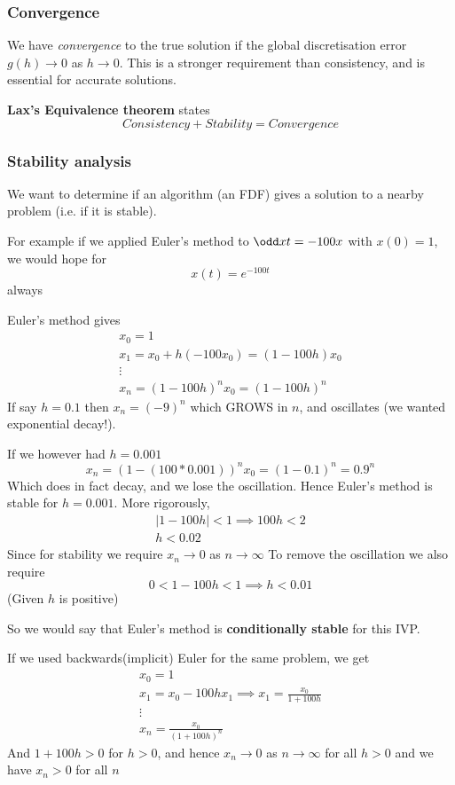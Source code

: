 \documentclass{X:/Documents/Coding/Latex/myassignment}
\begin{document}
\subsubsection{Convergence}
We have \textit{convergence} to the true solution if the global discretisation error $g(h)\to 0$ as $h\to0$. This is a stronger requirement than consistency, and is essential for accurate solutions.

\textbf{Lax's Equivalence theorem} states
\[Consistency + Stability = Convergence\]

\subsubsection{Stability analysis}
We want to determine if an algorithm (an FDF) gives a solution to a nearby problem (i.e. if it is stable).

For example if we applied Euler's method to $\odd xt = -100x$ with $x(0)=1$, we would hope for
\[x(t) = e^{-100t}\]
always

Euler's method gives
\begin{align*}
    x_0 = 1\\
    x_1 = x_0 + h(-100x_0) = (1-100h)x_0\\
    \vdots\\
    x_n = (1-100h)^n x_0 = (1-100h)^n
\end{align*}
If say $h = 0.1$ then $x_n = (-9)^n$ which GROWS in $n$, and oscillates (we wanted exponential decay!).

If we however had $h = 0.001$
\[x_n = (1-(100*0.001))^n x_0 = (1-0.1)^n = 0.9^n\]
Which does in fact decay, and we lose the oscillation.
Hence Euler's method is stable for $h=0.001$.
More rigorously, 
\begin{align*}
    |1-100h|<1 \implies 100h < 2\\
    h < 0.02
\end{align*}
Since for stability we require $x_n\to 0$ as $n\to \infty$
To remove the oscillation we also require 
\[0<1-100h < 1 \implies h < 0.01\]
(Given $h$ is positive)

So we would say that Euler's method is \textbf{conditionally stable} for this IVP.

If we used backwards(implicit) Euler for the same problem, we get
\begin{align*}
    x_0 = 1\\
    x_1 = x_0 - 100h x_1 \implies x_1 = \frac{x_0}{1+100h}\\
    \vdots\\
    x_n = \frac{x_0}{(1+100h)^n}
\end{align*}
And $1+100h > 0$ for $h >0$, and hence $x_n\to 0$ as $n\to\infty$ for all $h>0$ and we have $x_n > 0$ for all $n$
\end{document}
